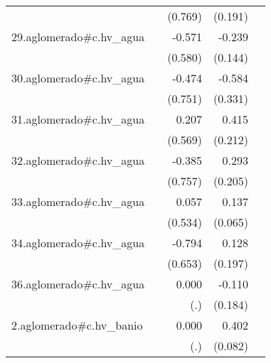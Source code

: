 {\begin{longtable}{l*{4}{D{.}{.}{-1}}}
            &                     &     (0.769)         &     (0.191)         &                     \\
\addlinespace
29.aglomerado#c.hv\_agua&                     &      -0.571         &      -0.239         &                     \\
            &                     &     (0.580)         &     (0.144)         &                     \\
\addlinespace
30.aglomerado#c.hv\_agua&                     &      -0.474         &      -0.584         &                     \\
            &                     &     (0.751)         &     (0.331)         &                     \\
\addlinespace
31.aglomerado#c.hv\_agua&                     &       0.207         &       0.415\sym{*}  &                     \\
            &                     &     (0.569)         &     (0.212)         &                     \\
\addlinespace
32.aglomerado#c.hv\_agua&                     &      -0.385         &       0.293         &                     \\
            &                     &     (0.757)         &     (0.205)         &                     \\
\addlinespace
33.aglomerado#c.hv\_agua&                     &       0.057         &       0.137\sym{*}  &                     \\
            &                     &     (0.534)         &     (0.065)         &                     \\
\addlinespace
34.aglomerado#c.hv\_agua&                     &      -0.794         &       0.128         &                     \\
            &                     &     (0.653)         &     (0.197)         &                     \\
\addlinespace
36.aglomerado#c.hv\_agua&                     &       0.000         &      -0.110         &                     \\
            &                     &         (.)         &     (0.184)         &                     \\
\addlinespace
2.aglomerado#c.hv\_banio&                     &       0.000         &       0.402\sym{***}&                     \\
            &                     &         (.)         &     (0.082)         &                     \\

\end{longtable}}
